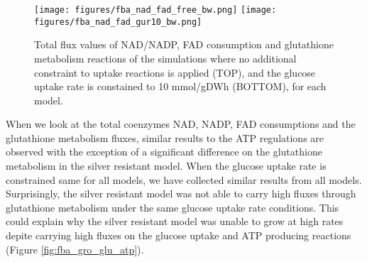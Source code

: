 \begin{figure}[H]
  \begin{center}
  \texttt{[image: figures/fba\_nad\_fad\_free\_bw.png]}
  \texttt{[image: figures/fba\_nad\_fad\_gur10\_bw.png]}
  \caption[Total flux values of NAD/NADP, FAD consumption and glutathione metabolism reactions of the simulations where  no additional constraint to uptake reactions is applied (TOP), and the glucose uptake rate is constained to 10 mmol/gDWh (BOTTOM), for each model]{Total flux values of NAD/NADP, FAD consumption and glutathione metabolism reactions of the simulations where  no additional constraint to uptake reactions is applied (TOP), and the glucose uptake rate is constained to 10 mmol/gDWh (BOTTOM), for each model.}
  \label{fig:fba_nad_fad}
  \end{center}
\end{figure}

When we look at the total coenzymes NAD, NADP, FAD consumptions and the glutathione metabolism fluxes, similar results to the ATP regulations are observed with the exception of a significant difference on the glutathione metabolism in the silver resistant model. When the glucose uptake rate is constrained same for all models, we have collected similar results from all models. Surprisingly, the silver resistant model was not able to carry high fluxes through glutathione metabolism under the same glucose uptake rate conditions. This could explain why the silver resistant model was unable to grow at high rates depite carrying high fluxes on the glucose uptake and ATP producing reactions (Figure \ref{fig:fba_gro_glu_atp}).


